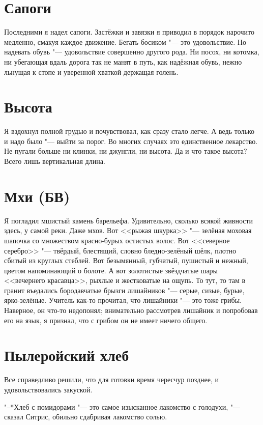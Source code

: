 \documentclass[a4paper,10pt,fleqn]{book}
\begin{document}
\section{Сапоги}

Последними я надел сапоги.
Застёжки и завязки я приводил в порядок нарочито медленно, смакуя каждое движение.
Бегать босиком "--- это удовольствие.
Но надевать обувь "--- удовольствие совершенно другого рода.
Ни посох, ни котомка, ни убегающая вдаль дорога так не манят в путь, как надёжная обувь, нежно льнущая к стопе и уверенной хваткой держащая голень.

\section{Высота}

Я вздохнул полной грудью и почувствовал, как сразу стало легче.
А ведь только и надо было "--- выйти за порог.
Во многих случаях это единственное лекарство.
Не пугали больше ни клинки, ни джунгли, ни высота.
Да и что такое высота?
Всего лишь вертикальная длина.

\section{Мхи (БВ)}

Я погладил мшистый камень барельефа.
Удивительно, сколько всякой живности здесь, у самой реки.
Даже мхов.
Вот <<рыжая шкурка>> "--- зелёная моховая шапочка со множеством красно-бурых остистых волос.
Вот <<северное серебро>> "--- твёрдый, блестящий, словно бледно-зелёный шёлк, плотно сбитый из круглых стеблей.
Вот безымянный, губчатый, пушистый и нежный, цветом напоминающий о болоте.
А вот золотистые звёздчатые шары <<вечернего красавца>>, рыхлые и жестковатые на ощупь.
То тут, то там в гранит въедались бородавчатые брызги лишайников "--- серые, сизые, бурые, ярко-зелёные.
Учитель как-то прочитал, что лишайники "--- это тоже грибы.
Наверное, он что-то недопонял;
внимательно рассмотрев лишайник и попробовав его на язык, я признал, что с грибом он не имеет ничего общего.

\section{Пылеройский хлеб}

Все справедливо решили, что для готовки время чересчур позднее, и удовольствовались закуской.

"--*Хлеб с помидорами "--- это самое изысканное лакомство с голодухи, "--- сказал Ситрис, обильно сдабривая лакомство солью.
\end{document}
